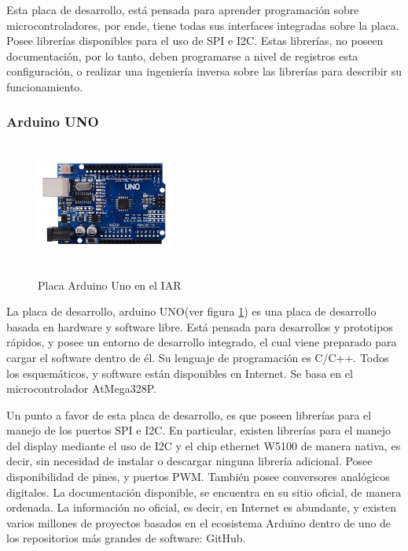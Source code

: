 Esta placa de desarrollo, está pensada para aprender programación sobre microcontroladores, por ende, tiene todas sus interfaces integradas sobre la placa. Posee librerías disponibles para el uso de SPI e I2C. Estas librerías, no poseen documentación, por lo tanto, deben programarse a nivel de registros esta configuración, o realizar una ingeniería inversa sobre las librerías para describir su funcionamiento.    
\vspace{-3mm}
 
\subsubsection{Arduino UNO }
\vspace{-5mm}
\begin{figure}
	\caption{Placa Arduino Uno en el IAR}
	\includegraphics[width=0.4\textwidth , height=  40mm]{arduino_uno}
	\label{fig:arduino_uno}	
\end{figure}




La placa de desarrollo, arduino UNO(ver figura \ref{fig:arduino_uno}) es una placa de desarrollo basada en hardware y software libre. Está pensada para desarrollos y prototipos rápidos, y posee un entorno de desarrollo integrado, el cual viene preparado para cargar el software dentro de él. Su lenguaje de programación es C/C++. Todos los esquemáticos, y software están disponibles en Internet. Se basa en el microcontrolador AtMega328P.  

Un punto a favor de esta placa de desarrollo, es que poseen librerías para el manejo de los puertos SPI e I2C. En particular, existen librerías para el manejo del display mediante el uso de I2C y el chip ethernet W5100 de manera nativa, es decir, sin necesidad de instalar o descargar ninguna librería adicional. Posee disponibilidad de pines,  y puertos PWM. También posee conversores analógicos digitales. La documentación disponible, se encuentra en su sitio oficial, de manera ordenada. 
La información no oficial, es decir, en Internet es abundante, y existen varios millones de proyectos basados en el ecosistema Arduino dentro de uno de los repositorios más grandes de software: GitHub.    

